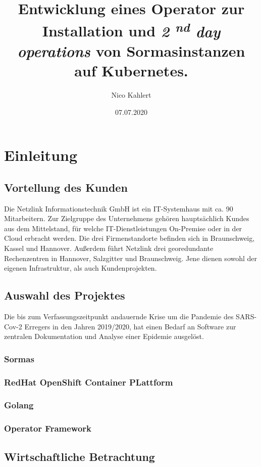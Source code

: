 \documentclass[a4paper,11pt]{article}
\title{
  Entwicklung eines Operator zur Installation und 
  \textit{2
  \textsuperscript{nd} day operations
  } von Sormasinstanzen auf Kubernetes.
}
\date{07.07.2020}
\author{Nico Kahlert}
\begin{document}
  \maketitle
  \newpage
  \tableofcontents
  \newpage
  \vspace{2.5cm}
  \section{Einleitung}
    \subsection{Vortellung des Kunden}
    Die Netzlink Informationstechnik GmbH ist ein IT-Systemhaus mit ca. 90
    Mitarbeitern. Zur Zielgruppe des Unternehmens gehören hauptsächlich 
    Kundes aus dem Mittelstand, für welche IT-Dienstleistungen On-Premise oder in der Cloud
    erbracht werden. Die drei Firmenstandorte befinden sich in Braunschweig, Kassel und Hannover.
    Außerdem führt Netzlink drei georedundante Rechenzentren in Hannover, Salzgitter und Braunschweig.
    Jene dienen sowohl der eigenen Infrastruktur, als auch Kundenprojekten. 
    \subsection{Auswahl des Projektes}
    Die bis zum Verfassungszeitpunkt andauernde Krise um die Pandemie des SARS-Cov-2 Erregers 
    in den Jahren 2019/2020, hat einen Bedarf an Software zur zentralen Dokumentation und Analyse 
    einer Epidemie ausgelöst.  
      \subsubsection{Sormas}
      \subsubsection{RedHat OpenShift Container PLattform}
      \subsubsection{Golang}
      \subsubsection{Operator Framework}
    \subsection{Wirtschaftliche Betrachtung}
\end{document}

